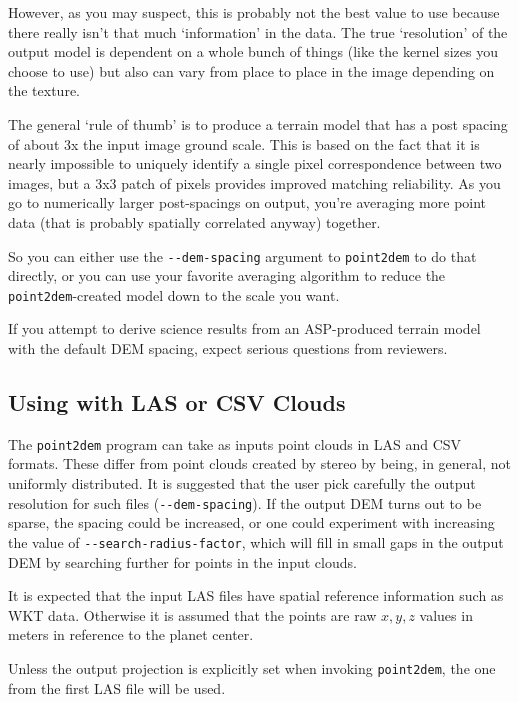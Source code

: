 However, as you may suspect, this is probably not the best value to
use because there really isn't that much `information' in the data.
The true `resolution' of the output model is dependent on a whole
bunch of things (like the kernel sizes you choose to use) but also can
vary from place to place in the image depending on the texture.

The general `rule of thumb' is to produce a terrain model that has a
post spacing of about 3x the input image ground scale.  This is based
on the fact that it is nearly impossible to uniquely identify a single
pixel correspondence between two images, but a 3x3 patch of pixels
provides improved matching reliability.  As you go to numerically
larger post-spacings on output, you're averaging more point data (that
is probably spatially correlated anyway) together.

So you can either use the \texttt{-\/-dem-spacing} argument to
\texttt{point2dem} to do that directly, or you can use your
favorite averaging algorithm to reduce the \texttt{point2dem}-created
model down to the scale you want.

If you attempt to derive science results from an ASP-produced terrain model
with the default \ac{DEM} spacing, expect serious questions from reviewers.

\subsection{Using with LAS or CSV Clouds}

The \texttt{point2dem} program can take as inputs point clouds in LAS
and CSV formats. These differ from point clouds created by stereo by
being, in general, not uniformly distributed.  It is suggested that the
user pick carefully the output resolution for such files
(\texttt{-\/-dem-spacing}). If the output \ac{DEM} turns out to be sparse,
the spacing could be increased, or one could experiment with increasing
the value of \texttt{-\/-search-radius-factor}, which will fill in small
gaps in the output \ac{DEM} by searching further for points in the input
clouds.

It is expected that the input LAS files have spatial reference
information such as WKT data. Otherwise it is assumed that the points
are raw $x,y,z$ values in meters in reference to the planet center.

Unless the output projection is explicitly set when invoking \texttt{point2dem},
the one from the first LAS file will be used.

